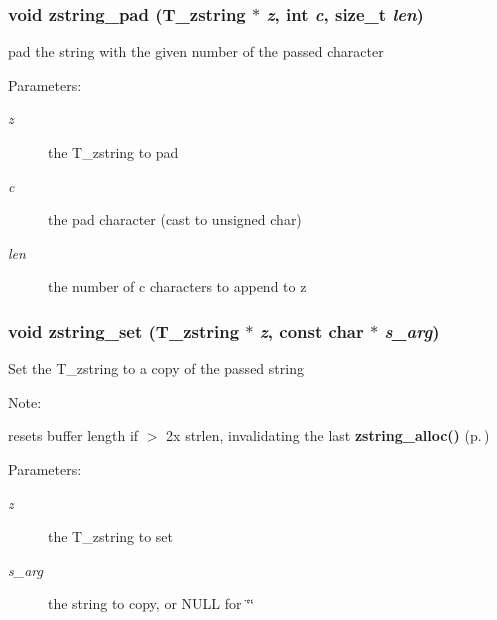 \subsubsection{\setlength{\rightskip}{0pt plus 5cm}void zstring\_\-pad ({\bf T\_\-zstring} $\ast$ {\em z}, int {\em c}, size\_\-t {\em len})}\label{group__zstring_a6}


pad the string with the given number of the passed character \begin{Desc}
\item[Parameters: ]\par
\begin{description}
\item[{\em 
z}]the T\_\-zstring to pad \item[{\em 
c}]the pad character (cast to unsigned char) \item[{\em 
len}]the number of c characters to append to z \end{description}
\end{Desc}
\subsubsection{\setlength{\rightskip}{0pt plus 5cm}void zstring\_\-set ({\bf T\_\-zstring} $\ast$ {\em z}, const char $\ast$ {\em s\_\-arg})}\label{group__zstring_a2}


Set the T\_\-zstring to a copy of the passed string \begin{Desc}
\item[Note: ]\par
resets buffer length if $>$ 2x strlen, invalidating the last {\bf zstring\_\-alloc()} {\rm (p.\,\pageref{group__zstring_a5})} \end{Desc}
\begin{Desc}
\item[Parameters: ]\par
\begin{description}
\item[{\em 
z}]the T\_\-zstring to set \item[{\em 
s\_\-arg}]the string to copy, or NULL for \char`\"{}\char`\"{} \end{description}
\end{Desc}
